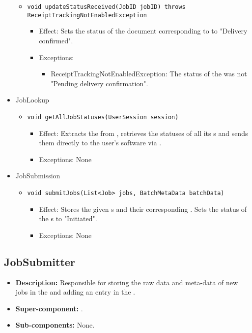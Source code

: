 \begin{itemize}
\begin{itemize}
		\item \texttt{void updateStatusReceived(JobID jobID) throws ReceiptTrackingNotEnabledException}
		\begin{itemize}
            \item Effect: Sets the status of the document corresponding to  to "Delivery confirmed".
            \item Exceptions:
			\begin{itemize}
				\item ReceiptTrackingNotEnabledException: The status of the  was not "Pending delivery confirmation".
			\end{itemize}
        \end{itemize}
    \end{itemize}

    \item JobLookup
    \begin{itemize}
        \item \texttt{void getAllJobStatuses(UserSession session)}
        \begin{itemize}
            \item Effect: Extracts the  from , retrieves the statuses of all its s and sends them directly to the user's software via .
            \item Exceptions: None
        \end{itemize}
    \end{itemize}

	\item JobSubmission
    \begin{itemize}
        \item \texttt{void submitJobs(List<Job> jobs, BatchMetaData batchData)}
        \begin{itemize}
            \item Effect: Stores the given s and their corresponding . Sets the status of the s to "Initiated".
            \item Exceptions: None
        \end{itemize}
    \end{itemize}
\end{itemize}

\subsection{JobSubmitter}
\begin{itemize}
    \item \textbf{Description:} Responsible for storing the raw data and meta-data of new jobs in the  and adding an entry in the .
    \item \textbf{Super-component:} .
    \item \textbf{Sub-components:} None.
\end{itemize}

